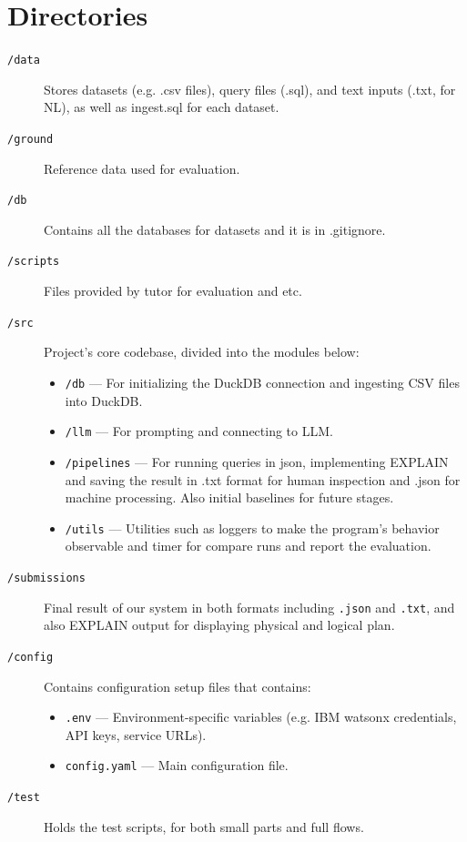 \documentclass[11pt,a4paper]{article}
\begin{document}
\section{ Directories}

\begin{description}

  \item[\texttt{/data}]%
Stores datasets (e.g. .csv files), query files (.sql), and text inputs (.txt, for NL), as well as ingest.sql for each dataset. 
  
  \item[\texttt{/ground}]%
Reference data used for evaluation.

  \item[\texttt{/db}]%
Contains all the databases for datasets and it is in .gitignore.

  \item[\texttt{/scripts}]%
Files provided by tutor for evaluation and etc.

\item[\texttt{/src}]%
Project’s core codebase, divided into the modules below:
  \begin{itemize}
    \item \texttt{/db} — For initializing the DuckDB connection and ingesting CSV files into DuckDB.
    \item \texttt{/llm} — For prompting and connecting to LLM.
    \item \texttt{/pipelines} — For running queries in json, implementing EXPLAIN and saving the result in .txt format for human inspection and .json for machine processing. Also initial baselines for future stages.
    \item \texttt{/utils} — Utilities such as loggers to make the program’s behavior observable and timer for compare runs and report the evaluation.
  \end{itemize}

\item[\texttt{/submissions}]%
Final result of our system in both formats including \texttt{.json} and \texttt{.txt}, and also EXPLAIN output for displaying physical and logical plan.

  \item[\texttt{/config}]%
  Contains configuration setup files that contains:
  \begin{itemize}
    \item \texttt{.env} — Environment-specific variables (e.g. IBM watsonx credentials, API keys, service URLs).
    \item \texttt{config.yaml} — Main configuration file.
  \end{itemize}

 \item[\texttt{/test}]%
Holds the test scripts, for both small parts and full flows.

\end{description}
\end{document}

